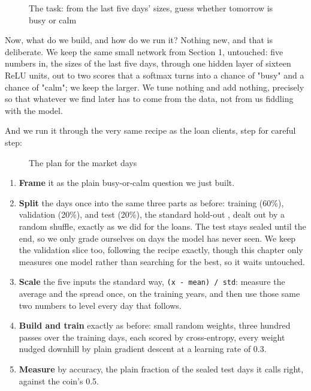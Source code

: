 \documentclass[11pt]{article} %
\begin{document}
\begin{figure}[htbp]
\centering

\caption{The task: from the last five days' sizes, guess whether tomorrow is busy or calm}
\end{figure}


Now, what do we build, and how do we run it? Nothing new, and that is deliberate. We keep the same small network from Section 1, untouched: five numbers in, the sizes of the last five days, through one hidden layer of sixteen ReLU units, out to two scores that a softmax turns into a chance of "busy" and a chance of "calm"; we keep the larger. We tune nothing and add nothing, precisely so that whatever we find later has to come from the data, not from us fiddling with the model.

And we run it through the very same recipe as the loan clients, step for careful step:

\begin{figure}[htbp]
\centering

\caption{The plan for the market days}
\end{figure}


\begin{enumerate}
\item \textbf{Frame} it as the plain busy-or-calm question we just built.
\item \textbf{Split} the days once into the same three parts as before: training (60\%), validation (20\%), and test (20\%), the standard hold-out \cite{hastie:2009}, dealt out by a random shuffle, exactly as we did for the loans. The test stays sealed until the end, so we only grade ourselves on days the model has never seen. We keep the validation slice too, following the recipe exactly, though this chapter only measures one model rather than searching for the best, so it waits untouched.
\item \textbf{Scale} the five inputs the standard way, \texttt{(x - mean) / std}: measure the average and the spread once, on the training years, and then use those same two numbers to level every day that follows.
\item \textbf{Build and train} exactly as before: small random weights, three hundred passes over the training days, each scored by cross-entropy, every weight nudged downhill by plain gradient descent at a learning rate of 0.3.
\item \textbf{Measure} by accuracy, the plain fraction of the sealed test days it calls right, against the coin's 0.5.
\end{enumerate}
\end{document}
